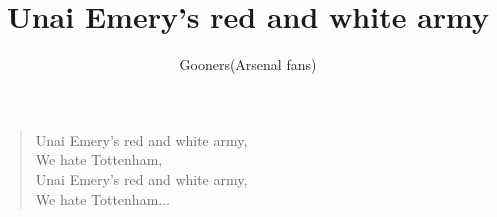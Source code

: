 \documentclass[a4paper,12pt]{article}
\title{Unai Emery's red and white army}
\author{Gooners(Arsenal fans)}
\date{}
\begin{document}
	
	\maketitle
	
	\begin{verse}
		
		Unai Emery's red and white army, \\
		We hate Tottenham, \\
		Unai Emery's red and white army, \\
		We hate Tottenham$\ldots$
		
	\end{verse}
	
\end{document}
